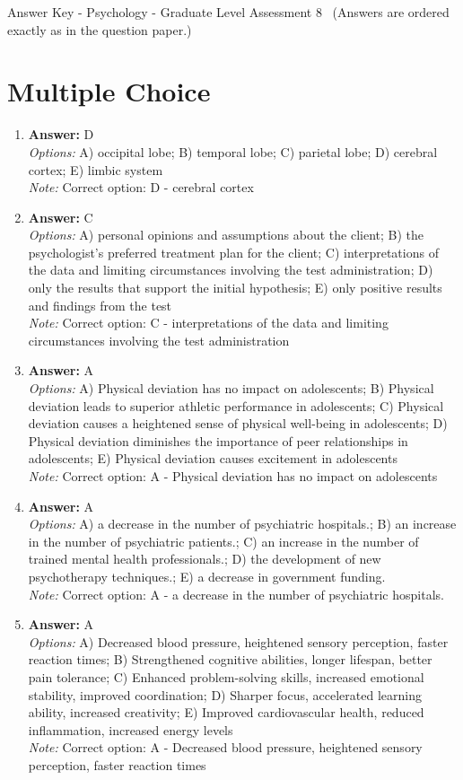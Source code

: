 \documentclass[12pt]{article}
\begin{document}
\begin{center}
Answer Key - Psychology - Graduate Level Assessment 8 \
\small (Answers are ordered exactly as in the question paper.)
\end{center}

\section*{Multiple Choice}
\begin{enumerate}[label=\arabic*.]
\item \textbf{Answer:} D
\\ \textit{Options:} A) occipital lobe; B) temporal lobe; C) parietal lobe; D) cerebral cortex; E) limbic system
\\ \textit{Note:} Correct option: D - cerebral cortex
\item \textbf{Answer:} C
\\ \textit{Options:} A) personal opinions and assumptions about the client; B) the psychologist's preferred treatment plan for the client; C) interpretations of the data and limiting circumstances involving the test administration; D) only the results that support the initial hypothesis; E) only positive results and findings from the test
\\ \textit{Note:} Correct option: C - interpretations of the data and limiting circumstances involving the test administration
\item \textbf{Answer:} A
\\ \textit{Options:} A) Physical deviation has no impact on adolescents; B) Physical deviation leads to superior athletic performance in adolescents; C) Physical deviation causes a heightened sense of physical well-being in adolescents; D) Physical deviation diminishes the importance of peer relationships in adolescents; E) Physical deviation causes excitement in adolescents
\\ \textit{Note:} Correct option: A - Physical deviation has no impact on adolescents
\item \textbf{Answer:} A
\\ \textit{Options:} A) a decrease in the number of psychiatric hospitals.; B) an increase in the number of psychiatric patients.; C) an increase in the number of trained mental health professionals.; D) the development of new psychotherapy techniques.; E) a decrease in government funding.
\\ \textit{Note:} Correct option: A - a decrease in the number of psychiatric hospitals.
\item \textbf{Answer:} A
\\ \textit{Options:} A) Decreased blood pressure, heightened sensory perception, faster reaction times; B) Strengthened cognitive abilities, longer lifespan, better pain tolerance; C) Enhanced problem-solving skills, increased emotional stability, improved coordination; D) Sharper focus, accelerated learning ability, increased creativity; E) Improved cardiovascular health, reduced inflammation, increased energy levels
\\ \textit{Note:} Correct option: A - Decreased blood pressure, heightened sensory perception, faster reaction times
\end{enumerate}
\end{document}
